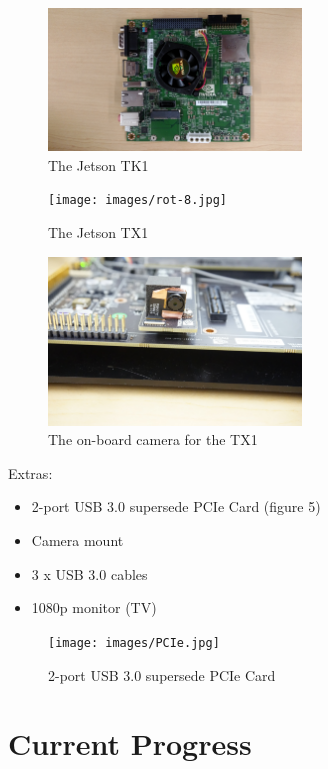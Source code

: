 \documentclass[letterpaper,10pt,titlepage]{IEEEtran}
\begin{document}
 \begin{figure}[!ht]
  \caption{The Jetson TK1}
	  \centering
		    \includegraphics[width=0.6\textwidth,natwidth=610,natheight=642]{images/rot-9.jpg}
				\end{figure}
\begin{figure}[!ht]
  \caption{The Jetson TX1}
	  \centering
		    \texttt{[image: images/rot-8.jpg]}
				\end{figure}
\begin{figure}[!ht]
  \caption{The on-board camera for the TX1}
	  \centering
		    \includegraphics[width=0.6\textwidth,natwidth=610,natheight=642]{images/onboardCamera.JPG}
				\end{figure}
	Extras: 
		\begin{itemize}
		\item 2-port USB 3.0 supersede PCIe Card (figure 5)
		\item Camera mount
		\item 3 x USB 3.0 cables
		\item 1080p monitor (TV)\\
		\end{itemize}

\begin{figure}[!ht]
  \caption{2-port USB 3.0 supersede PCIe Card}
	  \centering
		    \texttt{[image: images/PCIe.jpg]}
				\end{figure}


\section{Current Progress}
\end{document}
